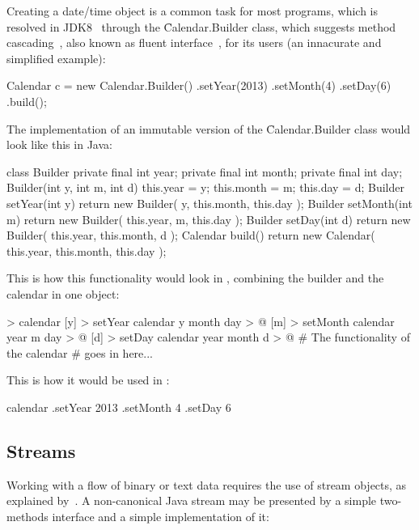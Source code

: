 Creating a date/time object is a common task for most programs, which
is resolved in JDK8~\citep{jdk8} through the \f{Calendar.Builder} class,
which suggests method cascading~\citep{beck1997smalltalk},
also known as fluent interface~\cite{fluentinterface}, for its users
(an innacurate and simplified example):

\begin{eocode}
Calendar c = new Calendar.Builder()
  .setYear(2013)
  .setMonth(4)
  .setDay(6)
  .build();
\end{eocode}

The implementation of an immutable version of the \f{Calendar.Builder}
class would look like this in Java:

\begin{eocode}
class Builder {
  private final int year;
  private final int month;
  private final int day;
  Builder(int y, int m, int d) {
    this.year = y;
    this.month = m;
    this.day = d;
  }
  Builder setYear(int y) {
    return new Builder(
      y, this.month, this.day
    );
  }
  Builder setMonth(int m) {
    return new Builder(
      this.year, m, this.day
    );
  }
  Builder setDay(int d) {
    return new Builder(
      this.year, this.month, d
    );
  }
  Calendar build() {
    return new Calendar(
      this.year, this.month, this.day
    );
  }
}
\end{eocode}

This is how this functionality would look in \eo{}, combining
the builder and the calendar in one object:

\begin{eocode}
 > calendar
  [y] > setYear
    calendar y month day > @
  [m] > setMonth
    calendar year m day > @
  [d] > setDay
    calendar year month d > @
  # The functionality of the calendar
  # goes in here...
\end{eocode}

This is how it would be used in \eo{}:

\begin{eocode}
calendar
.setYear 2013
.setMonth 4
.setDay 6
\end{eocode}

\subsection{Streams}

Working with a flow of binary or text data requires the use
of stream objects, as explained by~\citet[p.226]{metsker2002}.
A non-canonical Java stream may be presented by a simple
two-methods interface and a simple implementation of it:


